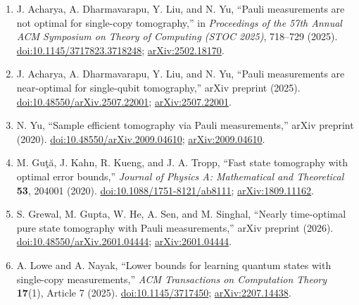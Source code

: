 \begin{enumerate}[label={},leftmargin=4.8em,labelsep=0.5em]
  \footnotesize
  \item[\textup{[ADLY25]}]\label{ref:df68-acharya-stoc}
  J. Acharya, A. Dharmavarapu, Y. Liu, and N. Yu, ``Pauli measurements are not optimal for single-copy tomography,'' in \emph{Proceedings of the 57th Annual ACM Symposium on Theory of Computing (STOC 2025)}, 718--729 (2025).
\href{https://doi.org/10.1145/3717823.3718248}{doi:10.1145/3717823.3718248};
\href{https://arxiv.org/abs/2502.18170}{arXiv:2502.18170}.

  \item[\textup{[ADLY25b]}]\label{ref:df68-acharya-single-qubit}
  J. Acharya, A. Dharmavarapu, Y. Liu, and N. Yu, ``Pauli measurements are near-optimal for single-qubit tomography,'' arXiv preprint (2025).
\href{https://doi.org/10.48550/arXiv.2507.22001}{doi:10.48550/arXiv.2507.22001};
\href{https://arxiv.org/abs/2507.22001}{arXiv:2507.22001}.

  \item[\textup{[Yu20]}]\label{ref:df68-yu}
  N. Yu, ``Sample efficient tomography via Pauli measurements,'' arXiv preprint (2020).
\href{https://doi.org/10.48550/arXiv.2009.04610}{doi:10.48550/arXiv.2009.04610};
\href{https://arxiv.org/abs/2009.04610}{arXiv:2009.04610}.

  \item[\textup{[GKKT20]}]\label{ref:df68-guta}
  M. Gu\c{t}\u{a}, J. Kahn, R. Kueng, and J. A. Tropp, ``Fast state tomography with optimal error bounds,'' \emph{Journal of Physics A: Mathematical and Theoretical} \textbf{53}, 204001 (2020).
\href{https://doi.org/10.1088/1751-8121/ab8111}{doi:10.1088/1751-8121/ab8111};
\href{https://arxiv.org/abs/1809.11162}{arXiv:1809.11162}.

  \item[\textup{[GGH+26]}]\label{ref:df68-grewal}
  S. Grewal, M. Gupta, W. He, A. Sen, and M. Singhal, ``Nearly time-optimal pure state tomography with Pauli measurements,'' arXiv preprint (2026).
\href{https://doi.org/10.48550/arXiv.2601.04444}{doi:10.48550/arXiv.2601.04444};
\href{https://arxiv.org/abs/2601.04444}{arXiv:2601.04444}.

  \item[\textup{[LN25]}]\label{ref:df68-lowe-nayak}
  A. Lowe and A. Nayak, ``Lower bounds for learning quantum states with single-copy measurements,'' \emph{ACM Transactions on Computation Theory} \textbf{17}(1), Article 7 (2025).
\href{https://doi.org/10.1145/3717450}{doi:10.1145/3717450};
\href{https://arxiv.org/abs/2207.14438}{arXiv:2207.14438}.


\end{enumerate}
